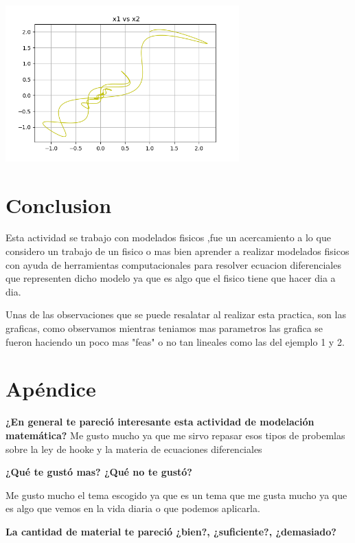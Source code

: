 \documentclass{article}
\begin{document}
\begin{center}
\includegraphics[height=6cm]{resortes2_4_6.png}
\end{center}


\section{Conclusion}

Esta actividad se trabajo con modelados fisicos ,fue un acercamiento a lo que considero un trabajo de un fisico o mas bien aprender a realizar modelados fisicos con ayuda de herramientas computacionales para resolver ecuacion diferenciales que representen dicho modelo ya que es algo que el fisico tiene que hacer dia a dia.

Unas de las observaciones que se puede resalatar al realizar esta practica, son las graficas, como observamos mientras teniamos mas parametros las grafica se fueron haciendo un poco mas "feas" o no tan lineales como las del ejemplo 1 y 2.


\section{Apéndice}

\textbf{¿En general te pareció interesante esta actividad de modelación matemática?}
 Me gusto mucho ya que me sirvo repasar esos tipos de probemlas sobre la ley de hooke y la materia de ecuaciones diferenciales

\vspace{0.3cm}

\textbf{¿Qué te gustó mas? ¿Qué no te gustó?}


Me gusto mucho el tema escogido ya que es un tema que me gusta mucho ya que es algo que vemos en la vida diaria o que podemos aplicarla.
\vspace{0.3cm}


\textbf{La cantidad de material te pareció ¿bien?, ¿suficiente?, ¿demasiado?}
\end{document}
